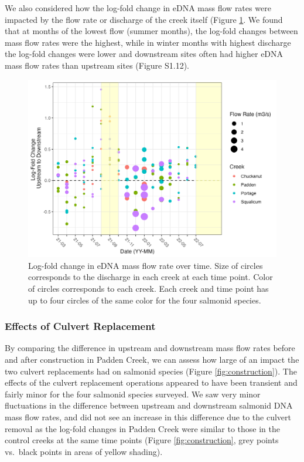 \documentclass[
]{article}
\begin{document}
We also considered how the log-fold change in eDNA mass flow rates were
impacted by the flow rate or discharge of the creek itself (Figure
\ref{fig:culverts_flow}. We found that at months of the lowest flow
(summer months), the log-fold changes between mass flow rates were the
highest, while in winter months with highest discharge the log-fold
changes were lower and downstream sites often had higher eDNA mass flow
rates than upstream sites (Figure S1.12).

\begin{figure}
\centering
\includegraphics{../Output/Figures/culvert_means_flow.png}
\caption{Log-fold change in eDNA mass flow rate over time. Size of
circles corresponds to the discharge in each creek at each time point.
Color of circles corresponds to each creek. Each creek and time point
has up to four circles of the same color for the four salmonid
species.\label{fig:culverts_flow}}
\end{figure}

\hypertarget{effects-of-culvert-replacement}{%
\subsubsection{Effects of Culvert
Replacement}\label{effects-of-culvert-replacement}}

By comparing the difference in upstream and downstream mass flow rates
before and after construction in Padden Creek, we can assess how large
of an impact the two culvert replacements had on salmonid species
(Figure \ref{fig:construction}). The effects of the culvert replacement
operations appeared to have been transient and fairly minor for the four
salmonid species surveyed. We saw very minor fluctuations in the
difference between upstream and downstream salmonid DNA mass flow rates,
and did not see an increase in this difference due to the culvert
removal as the log-fold changes in Padden Creek were similar to those in
the control creeks at the same time points (Figure
\ref{fig:construction}, grey points vs.~black points in areas of yellow
shading).
\end{document}
